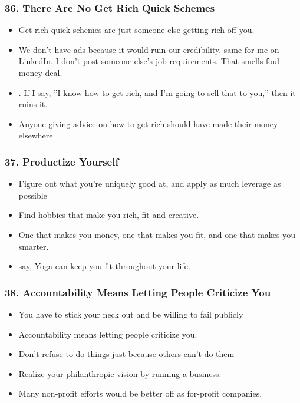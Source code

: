 \begin{frame}[fragile]
\frametitle{36. There Are No Get Rich Quick Schemes}
\begin{itemize}
\item Get rich quick schemes are just someone else getting rich off  you.
\item We don't have ads because it would ruin our credibility. same for me on LinkedIn. I don't post someone else's job requirements. That smells foul money deal.
\item . If I say, ''I know how to get rich, and I'm going to sell that to you,'' then it ruins it.
\item Anyone giving advice on how to get rich should have made their money elsewhere
\end{itemize}
\end{frame}

\begin{frame}[fragile]
\frametitle{37. Productize Yourself}
\begin{itemize}
\item Figure out what you're uniquely good at, and apply as much leverage as possible
\item Find hobbies that make you rich, fit and creative.
\item One that makes you money, one that makes you  fit, and one that
makes you smarter. 
\item say, Yoga can keep you fit throughout your life.
\end{itemize}
\end{frame}

\begin{frame}[fragile]
\frametitle{38. Accountability Means Letting People Criticize You}
\begin{itemize}
\item You have to stick your neck out and be willing to fail publicly
\item Accountability means letting people criticize you.
\item Don't refuse to do things just because others can't do them
\item Realize your philanthropic vision by running a business.
\item Many non-profit efforts would be better off  as for-profit companies.
\end{itemize}
\end{frame}

